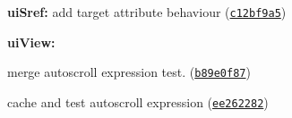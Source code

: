 {\bfseries {\bfseries {\bfseries {\bfseries {\bfseries 
\begin{DoxyItemize}
\item {\bfseries ui\+Sref\+:} add target attribute behaviour (\href{https://github.com/angular-ui/ui-router/commit/c12bf9a520d30d70294e3d82de7661900f8e394e}{\tt c12bf9a5})
\item {\bfseries ui\+View\+:}
\begin{DoxyItemize}
\item merge autoscroll expression test. (\href{https://github.com/angular-ui/ui-router/commit/b89e0f871d5cc35c10925ede986c10684d5c9252}{\tt b89e0f87})
\item cache and test autoscroll expression (\href{https://github.com/angular-ui/ui-router/commit/ee2622828c2ce83807f006a459ac4e11406d9258}{\tt ee262282}) 
\end{DoxyItemize}
\end{DoxyItemize}}}}}}